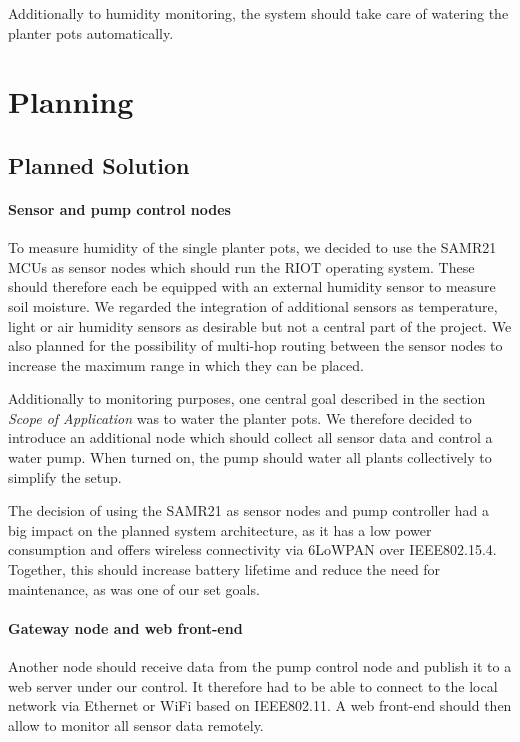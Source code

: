 \documentclass[11pt,paper=a4,parskip=half]{scrartcl}
\begin{document}
  Additionally to humidity monitoring, the system should take care of watering
  the planter pots automatically.

\section{Planning}
\subsection{Planned Solution}
  \paragraph{Sensor and pump control nodes} To measure humidity of the single
  planter pots, we decided to use the SAMR21 MCUs as sensor nodes which should
  run the RIOT operating system. These should therefore each be equipped with
  an external humidity sensor to measure soil moisture. We regarded the
  integration of additional sensors as temperature, light or air humidity
  sensors as desirable but not a central part of the project. We also planned
  for the possibility of multi-hop routing between the sensor nodes to increase
  the maximum range in which they can be placed.

  Additionally to monitoring purposes, one central goal described in the
  section \textit{Scope of Application} was to water the planter pots. We
  therefore decided  to introduce an additional node which should collect all
  sensor data and control a water pump. When turned on, the pump should water
  all plants collectively to simplify the setup.

  The decision of using the SAMR21 as sensor nodes and pump controller had a
  big impact on the planned system architecture, as it has a low power
  consumption and offers wireless connectivity via 6LoWPAN over IEEE802.15.4.
  Together, this should increase battery lifetime and reduce the need for
  maintenance, as was one of our set goals.

  \paragraph{Gateway node and web front-end} Another node should receive data
  from the pump control node and publish it to a web server under our control.
  It therefore had to be able to connect to the local network via Ethernet or
  WiFi based on IEEE802.11. A web front-end should then allow to monitor all
  sensor data remotely.
\end{document}
